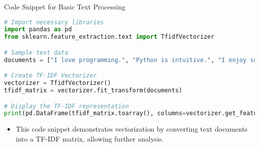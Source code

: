\documentclass[aspectratio=169]{beamer}
\begin{document}
\begin{frame}[fragile]{Code Snippet for Basic Text Processing}
\begin{lstlisting}[language=Python]
# Import necessary libraries
import pandas as pd
from sklearn.feature_extraction.text import TfidfVectorizer

# Sample text data
documents = ["I love programming.", "Python is intuitive.", "I enjoy solving problems."]

# Create TF-IDF Vectorizer
vectorizer = TfidfVectorizer()
tfidf_matrix = vectorizer.fit_transform(documents)

# Display the TF-IDF representation
print(pd.DataFrame(tfidf_matrix.toarray(), columns=vectorizer.get_feature_names_out()))
\end{lstlisting}
\begin{itemize}
    \item This code snippet demonstrates vectorization by converting text documents into a TF-IDF matrix, allowing further analysis.
\end{itemize}
\end{frame}
\end{document}
